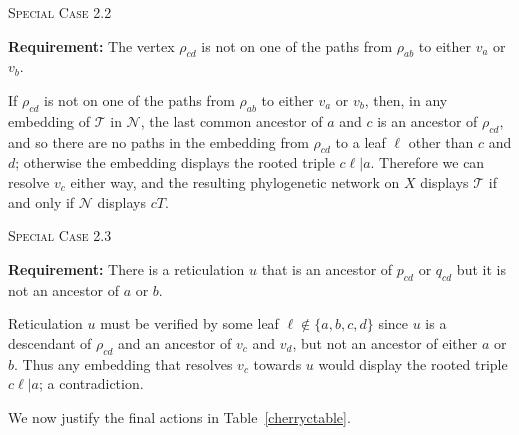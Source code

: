 \documentclass[11pt]{amsart}
\begin{document}
\begin{algorithm}[H]
 \caption{\textsc{Special Case 2.2}}
\begin{algorithmic}[1]
 \Statex\textbf{Requirement:} The vertex $\rho_{cd}$ is not on one of the paths from $\rho_{ab}$ to either $v_a$ or $v_b$.
 \end{algorithmic}
\end{algorithm}

If $\rho_{cd}$ is not on one of the paths from $\rho_{ab}$ to either $v_a$ or $v_b$, then, in any embedding of ${{\mathcal T}}$ in ${{\mathcal N}}$, the last common ancestor of $a$ and $c$ is an ancestor of $\rho_{cd}$, and so there are no paths in the embedding from $\rho_{cd}$ to a leaf $\ell$ other than $c$ and $d$; otherwise the embedding displays the rooted triple $c\ell|a$. Therefore we can resolve $v_c$ either way, and the resulting phylogenetic network on $X$ displays ${{\mathcal T}}$ if and only if ${{\mathcal N}}$ displays $cT$.

\begin{algorithm}[H]
 \caption{\textsc{Special Case 2.3}}
\begin{algorithmic}[1]
 \Statex\textbf{Requirement:} There is a reticulation $u$ that is an ancestor of $p_{cd}$ or $q_{cd}$ but it is not an ancestor of $a$ or $b$.
	\Else
	       \EndIf
 \end{algorithmic}
\end{algorithm}

Reticulation $u$ must be verified by some leaf $\ell\not\in \{a, b, c, d\}$ since $u$ is a descendant of $\rho_{cd}$ and an ancestor of $v_c$ and $v_d$, but not an ancestor of either $a$ or $b$. Thus any embedding that resolves $v_c$ towards $u$ would display the rooted triple $c\ell|a$; a contradiction.

We now justify the final actions in Table~\ref{cherryctable}.
\end{document}
